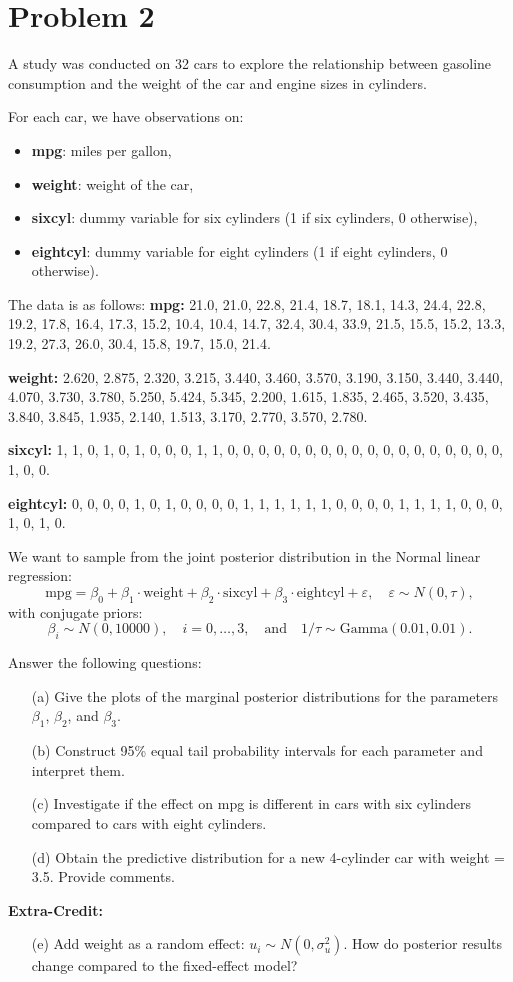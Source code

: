 \documentclass{article}
\begin{document}
\section*{Problem 2}
A study was conducted on 32 cars to explore the relationship between gasoline consumption and the weight of the car and engine sizes in cylinders.

For each car, we have observations on:
\begin{itemize}
    \item \textbf{mpg}: miles per gallon,
    \item \textbf{weight}: weight of the car,
    \item \textbf{sixcyl}: dummy variable for six cylinders (1 if six cylinders, 0 otherwise),
    \item \textbf{eightcyl}: dummy variable for eight cylinders (1 if eight cylinders, 0 otherwise).
\end{itemize}

\noindent The data is as follows:  
\textbf{mpg:} 21.0, 21.0, 22.8, 21.4, 18.7, 18.1, 14.3, 24.4, 22.8, 19.2, 17.8, 16.4, 17.3, 15.2, 10.4, 10.4, 14.7, 32.4, 30.4, 33.9, 21.5, 15.5, 15.2, 13.3, 19.2, 27.3, 26.0, 30.4, 15.8, 19.7, 15.0, 21.4.

\textbf{weight:} 2.620, 2.875, 2.320, 3.215, 3.440, 3.460, 3.570, 3.190, 3.150, 3.440, 3.440, 4.070, 3.730, 3.780, 5.250, 5.424, 5.345, 2.200, 1.615, 1.835, 2.465, 3.520, 3.435, 3.840, 3.845, 1.935, 2.140, 1.513, 3.170, 2.770, 3.570, 2.780.

\textbf{sixcyl:} 1, 1, 0, 1, 0, 1, 0, 0, 0, 1, 1, 0, 0, 0, 0, 0, 0, 0, 0, 0, 0, 0, 0, 0, 0, 0, 0, 0, 0, 1, 0, 0.

\textbf{eightcyl:} 0, 0, 0, 0, 1, 0, 1, 0, 0, 0, 0, 1, 1, 1, 1, 1, 1, 0, 0, 0, 0, 1, 1, 1, 1, 0, 0, 0, 1, 0, 1, 0.

We want to sample from the joint posterior distribution in the Normal linear regression:
\[
\text{mpg} = \beta_0 + \beta_1 \cdot \text{weight} + \beta_2 \cdot \text{sixcyl} + \beta_3 \cdot \text{eightcyl} + \varepsilon, \quad \varepsilon \sim N(0, \tau),
\]
with conjugate priors:
\[
\beta_i \sim N(0, 10000), \quad i = 0, \dots, 3, \quad \text{and} \quad 1/\tau \sim \text{Gamma}(0.01, 0.01).
\]

Answer the following questions:
\begin{enumerate}
    \item[(a)] Give the plots of the marginal posterior distributions for the parameters $\beta_1$, $\beta_2$, and $\beta_3$.
    \item[(b)] Construct 95\% equal tail probability intervals for each parameter and interpret them.
    \item[(c)] Investigate if the effect on mpg is different in cars with six cylinders compared to cars with eight cylinders.
    \item[(d)] Obtain the predictive distribution for a new 4-cylinder car with weight = 3.5. Provide comments.
\end{enumerate}

\noindent\textbf{Extra-Credit:}
\begin{enumerate}
    \item[(e)] Add weight as a random effect: $u_i \sim N(0, \sigma_u^2)$. How do posterior results change compared to the fixed-effect model?
\end{enumerate}
\end{document}
